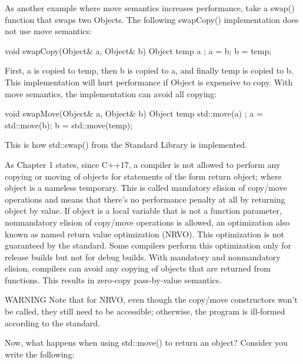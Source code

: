 
As another example where move semantics increases performance, take a swap() function that swaps two Objects. The following swapCopy() implementation does not use move semantics:

\begin{cpp}
void swapCopy(Object& a, Object& b)
{
    Object temp { a };
    a = b;
    b = temp;
}
\end{cpp}

First, a is copied to temp, then b is copied to a, and finally temp is copied to b. This implementation will hurt performance if Object is expensive to copy. With move semantics, the implementation can avoid all copying:

\begin{cpp}
void swapMove(Object& a, Object& b)
{
    Object temp { std::move(a) };
    a = std::move(b);
    b = std::move(temp);
}
\end{cpp}

This is how std::swap() from the Standard Library is implemented.


As Chapter 1 states, since C++17, a compiler is not allowed to perform any copying or moving of objects for statements of the form return object; where object is a nameless temporary. This is called mandatory elision of copy/move operations and means that there’s no performance penalty at all by returning object by value. If object is a local variable that is not a function parameter, nonmandatory elision of copy/move operations is allowed, an optimization also known as named return value optimization (NRVO). This optimization is not guaranteed by the standard. Some compilers perform this optimization only for release builds but not for debug builds. With mandatory and nonmandatory elision, compilers can avoid any copying of objects that are returned from functions. This results in zero-copy pass-by-value semantics.

\begin{myWarning}{WARNING}
 Note that for NRVO, even though the copy/move constructors won’t be called, they still need to be accessible; otherwise, the program is ill-formed according to the standard.
\end{myWarning}

Now, what happens when using std::move() to return an object? Consider you write the following:

